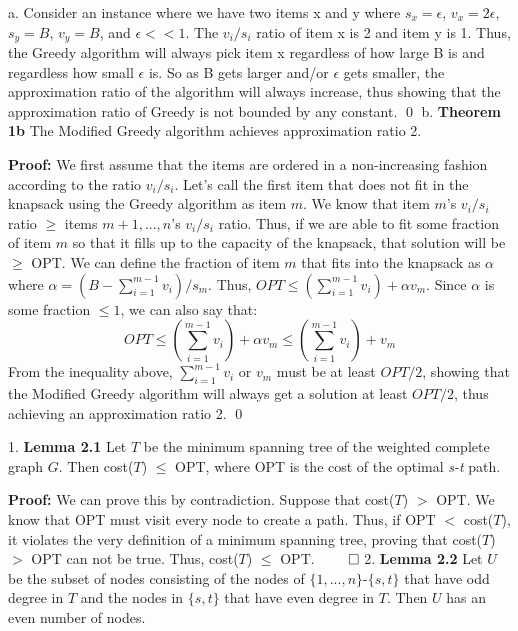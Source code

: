 \documentclass[oneside]{homework} %
\begin{document}
\maketitle
\skipevenpage

{\large a.} Consider an instance where we have two items x and y where $s_x = \epsilon$, $v_x = 2\epsilon$, $s_y = B$, $v_y =B$, and $\epsilon << 1$. The $v_i/s_i$ ratio of item x is 2 and item y is 1. Thus, the Greedy algorithm will always pick item x regardless of how large B is and regardless how small $\epsilon$ is. So as B gets larger and/or $\epsilon$ gets smaller, the approximation ratio of the algorithm will always increase, thus showing that the approximation ratio of Greedy is not bounded by any constant. \hfill\qed
\newline
\newline
{\large b.} \textbf{Theorem 1b} The Modified Greedy algorithm achieves approximation ratio 2.
\newline

\textbf{Proof:} We first assume that the items are ordered in a non-increasing fashion according to the ratio $v_i/s_i$. Let's call the first item that does not fit in the knapsack using the Greedy algorithm as item $m$. We know that item $m$'s $v_i/s_i$ ratio $\geq$ items $m+1,...,n$'s $v_i/s_i$ ratio. Thus, if we are able to fit some fraction of item $m$ so that it fills up to the capacity of the knapsack, that solution will be $\geq$ OPT. We can define the fraction of item $m$ that fits into the knapsack as $\alpha$ where $\alpha = (B - \sum\limits_{i=1}^{m-1} v_i) / s_m$. Thus, $OPT \leq (\sum\limits_{i=1}^{m-1} v_i) + \alpha v_m$. Since $\alpha$ is some fraction $\leq 1$, we can also say that: $$OPT \leq (\sum\limits_{i=1}^{m-1} v_i) + \alpha v_m \leq (\sum\limits_{i=1}^{m-1} v_i) + v_m$$ From the inequality above, $\sum\limits_{i=1}^{m-1} v_i$ or $v_m$ must be at least $OPT/2$, showing that the Modified Greedy algorithm will always get a solution at least $OPT/2$, thus achieving an approximation ratio 2. \hfill\qed

{\large1.} \textbf{Lemma 2.1} Let $T$ be the minimum spanning tree of the weighted complete graph $G$. Then cost($T$) $\leq$ OPT, where OPT is the cost of the optimal \textit{s-t} path.
\newline

\textbf{Proof:} We can prove this by contradiction. Suppose that cost($T$) $>$ OPT. We know that OPT must visit every node to create a path. Thus, if OPT $<$ cost($T$), it violates the very definition of a minimum spanning tree, proving that cost($T$) $>$ OPT can not be true. Thus, cost($T$) $\leq$ OPT. \hfill$\qed$
\newline
\newline
{\large2.} \textbf{Lemma 2.2} Let $U$ be the subset of nodes consisting of the nodes of $\{1,...,n\}$-$\{s,t\}$ that have odd degree in $T$ and the nodes in $\{s,t\}$ that have even degree in $T$. Then $U$ has an even number of nodes.
\newline
\end{document}
